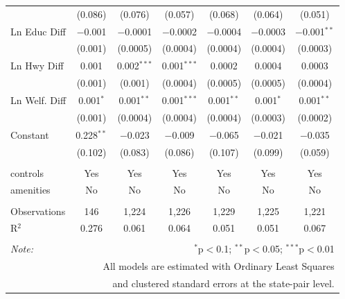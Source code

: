 \begin{table}[!htbp]
\begin{tabular}{@{\extracolsep{5pt}}lcccccc}
  & (0.086) & (0.076) & (0.057) & (0.068) & (0.064) & (0.051) \\ 
  Ln Educ Diff & $-$0.001 & $-$0.0001 & $-$0.0002 & $-$0.0004 & $-$0.0003 & $-$0.001$^{**}$ \\ 
  & (0.001) & (0.0005) & (0.0004) & (0.0004) & (0.0004) & (0.0003) \\ 
  Ln Hwy Diff & 0.001 & 0.002$^{***}$ & 0.001$^{***}$ & 0.0002 & 0.0004 & 0.0003 \\ 
  & (0.001) & (0.001) & (0.0004) & (0.0005) & (0.0005) & (0.0004) \\ 
  Ln Welf. Diff & 0.001$^{*}$ & 0.001$^{**}$ & 0.001$^{***}$ & 0.001$^{**}$ & 0.001$^{*}$ & 0.001$^{**}$ \\ 
  & (0.001) & (0.0004) & (0.0004) & (0.0004) & (0.0003) & (0.0002) \\ 
  Constant & 0.228$^{**}$ & $-$0.023 & $-$0.009 & $-$0.065 & $-$0.021 & $-$0.035 \\ 
  & (0.102) & (0.083) & (0.086) & (0.107) & (0.099) & (0.059) \\ 
 \hline \\[-1.8ex] 
controls & Yes & Yes & Yes & Yes & Yes & Yes \\ 
amenities & No & No & No & No & No & No \\ 
\hline \\[-1.8ex] 
Observations & 146 & 1,224 & 1,226 & 1,229 & 1,225 & 1,221 \\ 
R$^{2}$ & 0.276 & 0.061 & 0.064 & 0.051 & 0.051 & 0.067 \\ 
\hline 
\hline \\[-1.8ex] 
\textit{Note:}  & \multicolumn{6}{r}{$^{*}$p$<$0.1; $^{**}$p$<$0.05; $^{***}$p$<$0.01} \\ 
 & \multicolumn{6}{r}{All models are estimated with Ordinary Least Squares} \\ 
 & \multicolumn{6}{r}{and clustered standard errors at the state-pair level.} \\ 
\end{tabular} 
\end{table} 

